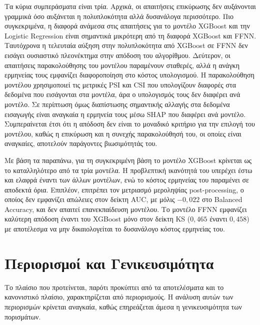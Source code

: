 Τα κύρια συμπεράσματα είναι τρία. Αρχικά, οι απαιτήσεις επικύρωσης
δεν αυξάνονται γραμμικά όσο αυξάνεται η πολυπλοκότητα αλλά
δυσανάλογα περισσότερο. Πιο συγκεκριμένα, η διαφορά ανάμεσα στις
απαιτήσεις για το μοντέλο XGBoost και την Logistic Regression είναι
σημαντικά μικρότερη από τη διαφορά XGBoost και FFNN. Ταυτόχρονα η
τελευταία αύξηση στην πολυπλοκότητα από XGBoost σε FFNN δεν εισάγει
ουσιαστικό πλεονέκτημα στην απόδοση του αλγορίθμου. Δεύτερον, οι
απαιτήσεις παρακολούθησης του μοντέλου παραμένουν σταθερές, αλλά η
ανάγκη ερμηνείας τους εμφανίζει διαφοροποίηση στο κόστος υπολογισμού.
Η παρακολούθηση μοντέλου χρησιμοποιεί τις μετρικές PSI και CSI που
υπολογίζουν διαφορές στα δεδομένα που εισάγονται στα μοντέλα, άρα ο
υπολογισμός τους δεν διαφέρει ανά μοντέλο. Σε περίπτωση όμως
διαπίστωσης σημαντικής αλλαγής στα δεδομένα εισαγωγής είναι αναγκαία
η ερμηνεία τους μέσω SHAP που διαφέρει ανά μοντέλο. Συμπεραίνεται
έτσι ότι η απόδοση δεν είναι το μοναδικό κριτήριο για την επιλογή
του μοντέλου, καθώς η επικύρωση και η συνεχής παρακολούθησή του,
οι οποίες είναι αναγκαίες, αποτελούν παράγοντες βιωσιμότητάς του.

Με βάση τα παραπάνω, για τη συγκεκριμένη βάση το μοντέλο XGBoost
κρίνεται ως το καταλληλότερο από τα τρία μοντέλα. Η προβλεπτική
ικανότητά του υπερέχει έστω και ελαφρά έναντι των άλλων μοντέλων,
ενώ το κόστος ερμηνείας του παραμένει σε αποδεκτά όρια. Επιπλέον,
επιτρέπει τον μετριασμό μεροληψίας post-processing, ο οποίος δεν
εμφανίζει απώλειες στον δείκτη AUC, με μόλις $-0{,}022$ στο
Balanced Accuracy, και δεν απαιτεί επανεκπαίδευση μοντέλου. Το
μοντέλο FFNN εμφανίζει καλύτερη απόδοση έναντι του XGBoost μόνο
στον δείκτη KS ($0{,}465$ έναντι $0{,}458$) με αποτέλεσμα να μην
δικαιολογείται το δυσανάλογο κόστος ερμηνείας του.

\section{Περιορισμοί και Γενικευσιμότητα}
\label{sec:limitations}

Το πλαίσιο που προτείνεται, παρότι προκύπτει από τα αποτελέσματα
και το κανονιστικό πλαίσιο, χαρακτηρίζεται από περιορισμούς.
Η ανάλυση αυτών των περιορισμών κρίνεται αναγκαία, καθώς
επηρεάζεται άμεσα η γενικευσιμότητα των πορισμάτων.

